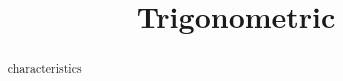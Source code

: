 \documentclass{ximera}
\title{Trigonometric}
\begin{document}
\begin{abstract}
characteristics
\end{abstract}
\maketitle
\end{document}
